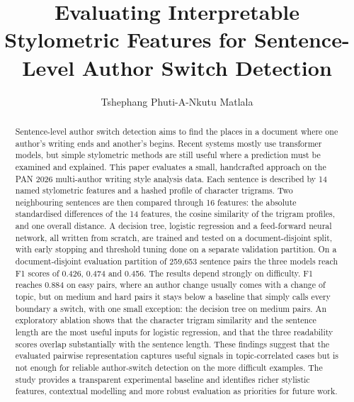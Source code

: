 \documentclass[runningheads]{llncs}
\begin{document}
\title{Evaluating Interpretable Stylometric Features for Sentence-Level Author Switch Detection}

\author{Tshephang Phuti-A-Nkutu Matlala}

\maketitle

\begin{abstract}
Sentence-level author switch detection aims to find the places in a document where one author's writing ends and another's begins. Recent systems mostly use transformer models, but simple stylometric methods are still useful where a prediction must be examined and explained. This paper evaluates a small, handcrafted approach on the PAN 2026 multi-author writing style analysis data. Each sentence is described by 14 named stylometric features and a hashed profile of character trigrams. Two neighbouring sentences are then compared through 16 features: the absolute standardised differences of the 14 features, the cosine similarity of the trigram profiles, and one overall distance. A decision tree, logistic regression and a feed-forward neural network, all written from scratch, are trained and tested on a document-disjoint split, with early stopping and threshold tuning done on a separate validation partition. On a document-disjoint evaluation partition of 259,653 sentence pairs the three models reach F1 scores of 0.426, 0.474 and 0.456. The results depend strongly on difficulty. F1 reaches 0.884 on easy pairs, where an author change usually comes with a change of topic, but on medium and hard pairs it stays below a baseline that simply calls every boundary a switch, with one small exception: the decision tree on medium pairs. An exploratory ablation shows that the character trigram similarity and the sentence length are the most useful inputs for logistic regression, and that the three readability scores overlap substantially with the sentence length. These findings suggest that the evaluated pairwise representation captures useful signals in topic-correlated cases but is not enough for reliable author-switch detection on the more difficult examples. The study provides a transparent experimental baseline and identifies richer stylistic features, contextual modelling and more robust evaluation as priorities for future work.
\end{abstract}
\end{document}
